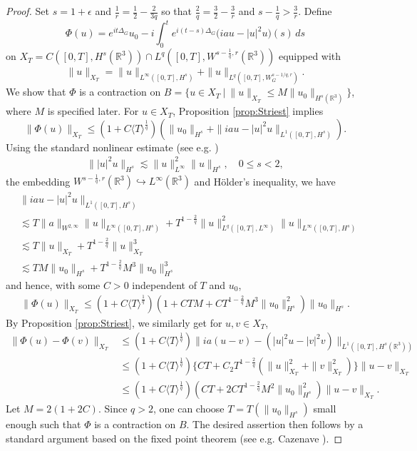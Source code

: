 \documentclass[10pt%
]{amsart}
\numberwithin{equation}{section}
\newcommand{\R}{\mathbb{R}}
\theoremstyle{definition}
\def\<{{\langle}}
\def\>{{\rangle}}
\begin{document}
\begin{proof}%
	Set $s=1+\epsilon$ and $\frac1r=\frac12-\frac{2}{3q}$ so that $\frac2q=\frac32-\frac3r$ and $s-\frac1q>\frac3r$. 
	Define		$$\Phi(u)=e^{it\Delta_G}u_0-i\int_0^t e^{i(t-s)\Delta_G}\big(iau-|u|^{2}u\big)(s)\,ds$$
	on $X_T=C([0,T], H^s(\R^3))\cap L^q([0,T], W^{s-\frac1q,r}(\R^3))$ equipped with 
	$$
	\|u\|_{X_T}=\|u\|_{L^\infty([0,T],H^s)}+\|u\|_{L^q([0,T],W^{s-1/q,r}_G)}. 
	$$
	We show that $\Phi$ is a contraction on
	$B=\big\{u\in X_T\ |\ \|u\|_{X_T}\leq M\|u_0\|_{H^s(\R^3)}\big\}$, 
	where $M$ is specified later. For $u\in X_T$, Proposition \ref{prop:Striest} implies
	$$
	\|\Phi(u)\|_{X_T}\le (1+C\<T\>^{\frac1q})(\|u_0\|_{H^s}+\|iau-|u|^{2}u\|_{L^1([0,T], H^s)}). 
	$$
	Using the standard nonlinear estimate (see e.g. \cite[Lemma 3.4]{GOV1994})
	\begin{align}
		\label{prop_LWP_proof_2}
		\||u|^2u\|_{H^s}\lesssim \|u\|_{L^\infty}^2\|u\|_{H^s},\quad 0\le s<2, 
	\end{align}
	the embedding $W^{s-\frac1q,r}(\R^3)\hookrightarrow L^\infty(\R^3)$ and H\"older's inequality, we have
	\begin{align*}
		&\big\|iau-|u|^{2}u\big\|_{L^1([0,T], H^s)}\\
		&\lesssim T\|a\|_{W^{2,\infty}}\|u\|_{L^\infty([0,T],H^s)}+T^{1-\frac2q}\|u\|_{L^q([0,T],L^\infty)}^{2}\|u\|_{L^\infty([0,T],H^s)}\\
		&\lesssim T\|u\|_{X_T}+T^{1-\frac2q}\|u\|_{X_T}^3\\
		&\lesssim TM\|u_0\|_{H^s}+T^{1-\frac2q}M^3\|u_0\|_{H^s}^3
	\end{align*}
	and hence, with some $C>0$ independent of $T$ and $u_0$, 
	\begin{align*}
		\|\Phi(u)\|_{X_T}\le (1+C\<T\>^{\frac1q})(1+CTM+CT^{1-\frac2q}M^3\|u_0\|_{H^s}^2)\|u_0\|_{H^s}.
	\end{align*}
	By Proposition \ref{prop:Striest}, we similarly get for $u,v\in X_T$, 
	\begin{align*}
		\|\Phi(u)-\Phi(v)\|_{X_T}%
		&\le (1+C\<T\>^{\frac1q})\|ia(u-v)-(|u|^2u-|v|^2v)\|_{L^1([0,T], H^s(\R^3))}\\
		&\le (1+C\<T\>^{\frac1q})\{CT+C_2T^{1-\frac{2}{q}}(\|u\|_{X_T}^{2}+\|v\|_{X_T}^{2})\}\|u-v\|_{X_T}\\
		&\le  (1+C\<T\>^{\frac1q})(CT+2CT^{1-\frac{2}{q}}M^2\|u_0\|_{H^s}^2)\|u-v\|_{X_T}. 
	\end{align*}
	Let $M=2(1+2C)$. Since $q>2$, one can choose $T=T(\|u_0\|_{H^s})$  small enough such that $\Phi$ is a contraction on $B$. The desired assertion then follows by a standard argument based on the fixed point theorem (see e.g. Cazenave \cite{Caz}). 
\end{proof}
\end{document}

